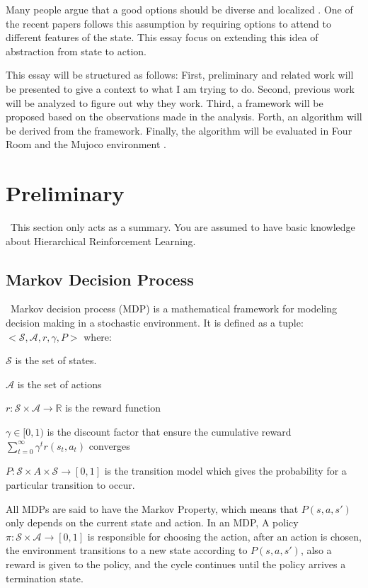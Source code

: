 \documentclass{article}
\begin{document}
	\quad Many people argue that a good options should be diverse and localized \cite{khetarpal2020options}. One of the recent papers \cite{attentionoptioncritic} follows this assumption by requiring options to attend to different features of the state. This essay focus on extending this idea of abstraction from state to action. 
	
	\quad This essay will be structured as follows: First, preliminary and related work will be presented to give a context to what I am trying to do. Second, previous work will be analyzed to figure out why they work. Third, a framework will be proposed based on the observations made in the analysis. Forth, an algorithm will be derived from the framework. Finally, the algorithm will be evaluated in Four Room and the Mujoco environment \cite{mujoco}.
	\section{Preliminary}
	\qquad \ This section only acts as a summary. You are assumed to have basic knowledge about Hierarchical Reinforcement Learning.
	\subsection*{Markov Decision Process}
	\qquad \  Markov decision process (MDP) \cite{sutton2018reinforcement} is a mathematical framework for modeling decision making in a stochastic environment. It is defined as a tuple: $<\mathcal{S}, \mathcal{A}, r, \gamma, P>$ where:
	
	$\mathcal{S}$ is the set of states.
	
	$\mathcal{A}$ is the set of actions
	
	$r : \mathcal{S} \times \mathcal{A} \rightarrow \mathbb{R}$ is the reward function
	
	$\gamma \in [0,1)$ is the discount factor that ensure the cumulative reward $\sum_{t=0}^{\infty} \gamma^t r(s_t, a_t)$ converges
	
	$P : \mathcal{S} \times A \times \mathcal{S} \rightarrow [0,1]$ is the transition model which gives the probability for a particular transition to occur.
	
	\quad All MDPs are said to have the Markov Property, which means that $P(s,a,s')$ only depends on the current state and action. In an MDP, A policy $\pi : \mathcal{S} \times \mathcal{A} \rightarrow [0,1]$ is responsible for choosing the action, after an action is chosen, the environment transitions to a new state according to $P(s,a,s')$, also a reward is given to the policy, and the cycle continues until the policy arrives a termination state.
\end{document}
